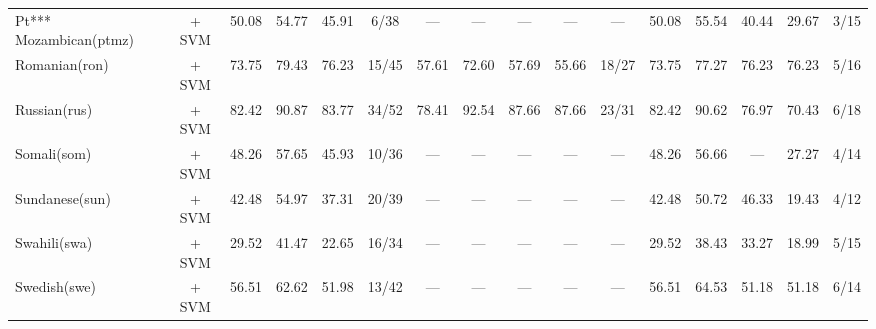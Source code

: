 \begin{table*}[h]
{\begin{tabular}{l|c|cccc|ccccc|ccccc}
            Pt*** Mozambican(ptmz) & \citep{wang2024multilingual}   + SVM                                   & 50.08                        & 54.77                        & 45.91                       & 6/38          & —             & —           & —              & —             & —             & 50.08         & 55.54       & 40.44          & 29.67         & 3/15          \\
            Romanian(ron)          & \citep{wang2024multilingual}     + SVM                                 & 73.75                        & 79.43                        & 76.23                       & 15/45         & 57.61         & 72.60       & 57.69          & 55.66         & 18/27         & 73.75         & 77.27       & 76.23          & 76.23         & 5/16          \\
            Russian(rus)           & \citep{snegirev2025russianfocusedembeddersexplorationrumteb}     + SVM & 82.42                        & 90.87                        & 83.77                       & 34/52         & 78.41         & 92.54       & 87.66          & 87.66         & 23/31         & 82.42         & 90.62       & 76.97          & 70.43         & 6/18          \\
            Somali(som)            & \citep{wang2024multilingual}       + SVM                               & 48.26                        & 57.65                        & 45.93                       & 10/36         & —             & —           & —              & —             & —             & 48.26         & 56.66       & —              & 27.27         & 4/14          \\
            Sundanese(sun)         & \citep{wang2024multilingual}      + SVM                                & 42.48                        & 54.97                        & 37.31                       & 20/39         & —             & —           & —              & —             & —             & 42.48         & 50.72       & 46.33          & 19.43         & 4/12          \\
            Swahili(swa)           & \citep{wang2024multilingual}      + SVM                                & 29.52                        & 41.47                        & 22.65                       & 16/34         & —             & —           & —              & —             & —             & 29.52         & 38.43       & 33.27          & 18.99         & 5/15          \\
            Swedish(swe)           & \citep{wang2024multilingual}     + SVM                                 & 56.51                        & 62.62                        & 51.98                       & 13/42         & —             & —           & —              & —             & —             & 56.51         & 64.53       & 51.18          & 51.18         & 6/14          \\

\end{tabular}}
\end{table*}

